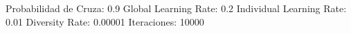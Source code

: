 Probabilidad de Cruza: 0.9
Global Learning Rate: 0.2
Individual Learning Rate: 0.01
Diversity Rate: 0.00001
Iteraciones: 10000
